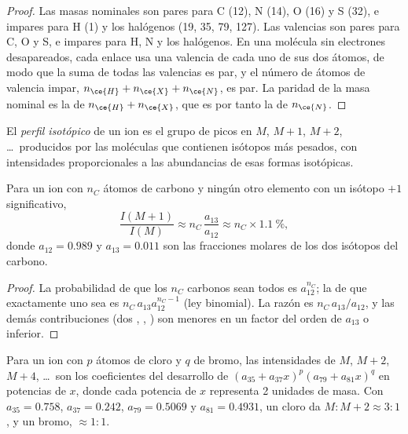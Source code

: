 \begin{proof}
Las masas nominales son pares para C (12), N (14), O (16) y S (32), e impares para H (1) y los halógenos (19,
35, 79, 127). Las valencias son pares para C, O y S, e impares para H, N y los halógenos. En una molécula
sin electrones desapareados, cada enlace usa una valencia de cada uno de sus dos átomos, de modo que la suma de todas las
valencias es par, y el número de átomos de valencia impar, $n_{\ce{H}} + n_{\ce{X}} + n_{\ce{N}}$, es
par. La paridad de la masa nominal es la de $n_{\ce{H}} + n_{\ce{X}}$, que es por tanto la de
$n_{\ce{N}}$.
\end{proof}

\begin{definition}\label{def:b2:mass-spec-atomic:isotope-pattern}
El \emph{perfil isotópico} de un ion es el grupo de picos en $M$, $M+1$,
$M+2$, \dots\ producidos por las moléculas que contienen isótopos más pesados, con intensidades proporcionales a
las abundancias de esas formas isotópicas.
\end{definition}

\begin{proposition}[El pico $M+1$]\label{prop:b2:mass-spec-atomic:m-plus-one}
Para un ion con $n_C$ átomos de carbono y ningún otro elemento con un isótopo $+1$ significativo,
\begin{equation*}
\frac{I(M+1)}{I(M)} \approx n_C\,\frac{a_{13}}{a_{12}} \approx n_C \times 1.1~\%,
\end{equation*}
donde $a_{12} = 0.989$ y $a_{13} = 0.011$ son las fracciones molares de los dos isótopos del carbono.
\end{proposition}

\begin{proof}
La probabilidad de que los $n_C$ carbonos sean todos  es $a_{12}^{n_C}$; la de que exactamente uno sea
 es $n_C\,a_{13}a_{12}^{n_C - 1}$ (ley binomial). La razón es $n_C\,a_{13}/a_{12}$, y las
demás contribuciones (dos , , ) son menores en un factor del orden de
$a_{13}$ o inferior.
\end{proof}

\begin{proposition}\label{prop:b2:mass-spec-atomic:halogen-patterns}
Para un ion con $p$ átomos de cloro y $q$ de bromo, las intensidades de $M$, $M+2$, $M+4$, \dots\ son
los coeficientes del desarrollo de $(a_{35} + a_{37}x)^p(a_{79} + a_{81}x)^q$ en potencias de $x$, donde cada
potencia de $x$ representa 2 unidades de masa. Con $a_{35} = 0.758$, $a_{37} = 0.242$, $a_{79} = 0.5069$ y
$a_{81} = 0.4931$, un cloro da $M : M+2 \approx 3 : 1$, y un bromo, $\approx 1 : 1$.
\end{proposition}

